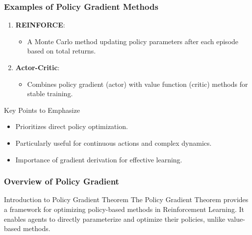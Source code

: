 \documentclass[aspectratio=169]{beamer}
\begin{document}
\begin{frame}[fragile]
    \frametitle{Examples of Policy Gradient Methods}
    \begin{enumerate}
        \item \textbf{REINFORCE}: 
            \begin{itemize}
                \item A Monte Carlo method updating policy parameters after each episode based on total returns.
            \end{itemize}
        
        \item \textbf{Actor-Critic}:
            \begin{itemize}
                \item Combines policy gradient (actor) with value function (critic) methods for stable training.
            \end{itemize}
    \end{enumerate}

    \begin{block}{Key Points to Emphasize}
        \begin{itemize}
            \item Prioritizes direct policy optimization.
            \item Particularly useful for continuous actions and complex dynamics.
            \item Importance of gradient derivation for effective learning.
        \end{itemize}
    \end{block}
\end{frame}

\begin{frame}[fragile]
    \frametitle{Overview of Policy Gradient}
    
    \begin{block}{Introduction to Policy Gradient Theorem}
        The Policy Gradient Theorem provides a framework for optimizing policy-based methods in Reinforcement Learning. It enables agents to directly parameterize and optimize their policies, unlike value-based methods.
    \end{block}
    
\end{frame}
\end{document}
